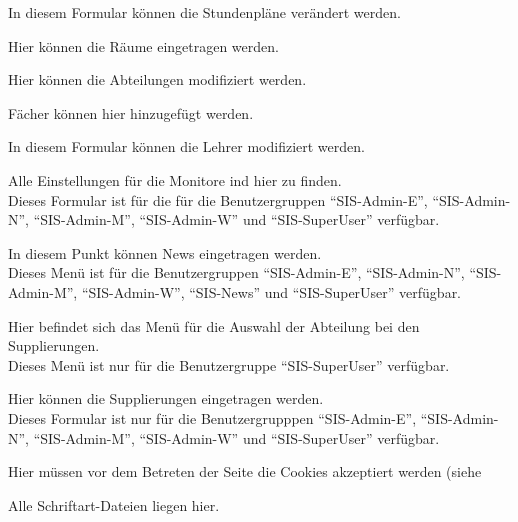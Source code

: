 \begin{description}[style=nextline]
\begin{description}[style=nextline]
\begin{description}[style=nextline]
							In diesem Formular können die Stundenpläne verändert werden.
						\item[./rooms/]
							Hier können die Räume eingetragen werden.
						\item[./sections/]
							Hier können die Abteilungen modifiziert werden.
						\item[./subjects/]
							Fächer können hier hinzugefügt werden.
						\item[./teachers/]
							In diesem Formular können die Lehrer modifiziert werden.
					\end{description}
				\item[./monitors/]
					Alle Einstellungen für die Monitore ind hier zu finden.\\
					Dieses Formular ist für die für die Benutzergruppen \enquote{SIS-Admin-E}, \enquote{SIS-Admin-N}, \enquote{SIS-Admin-M}, \enquote{SIS-Admin-W} und \enquote{SIS-SuperUser} verfügbar.
				\item[./news/]
					In diesem Punkt können News eingetragen werden.\\
					Dieses Menü ist für die Benutzergruppen \enquote{SIS-Admin-E}, \enquote{SIS-Admin-N}, \enquote{SIS-Admin-M}, \enquote{SIS-Admin-W}, \enquote{SIS-News} und \enquote{SIS-SuperUser} verfügbar.
				\item[./substitudes/]
					Hier befindet sich das Menü für die Auswahl der Abteilung bei den Supplierungen.\\
					Dieses Menü ist nur für die Benutzergruppe \enquote{SIS-SuperUser} verfügbar.
					\begin{description}[style=nextline]
						\item[./form/]
							Hier können die Supplierungen eingetragen werden.\\
							Dieses Formular ist nur für die Benutzergrupppen \enquote{SIS-Admin-E}, \enquote{SIS-Admin-N}, \enquote{SIS-Admin-M}, \enquote{SIS-Admin-W} und \enquote{SIS-SuperUser} verfügbar.
					\end{description}
		\end{description}	
	\item[/cookies/]
			Hier müssen vor dem Betreten der Seite die Cookies akzeptiert werden (siehe %
		\item[/data/]
			\begin{description}[style=nextline]
				\item[./fonts/]
					Alle Schriftart-Dateien liegen hier.
				\item[./images/]

\end{description}
\end{description}
